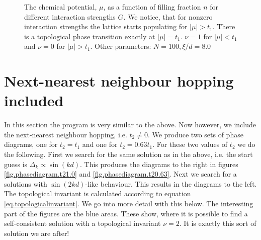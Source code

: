 \begin{figure}
\begin{center}

\caption{The chemical potential, $\mu$, as a function of filling fraction $n$ for different interaction strengths $G$. We notice, that for nonzero interaction strengths the lattice starts populating for $|\mu| > t_1$. There is a topological phase transition exactly at $|\mu| = t_1$. $\nu = 1$ for $|\mu|< t_1$ and $\nu = 0$ for $|\mu| > t_1$. Other parameters: $N = 100, \xi / d = 8.0$}
\label{fig.mun.t20.Gdepend}
\end{center}
\end{figure}

\section{Next-nearest neighbour hopping included}
\label{sec.NNNincluded} 
In this section the program is very similar to the above. Now however, we include the next-nearest neighbour hopping, i.e. $t_2 \neq 0$. We produce two sets of phase diagrams, one for $t_2 = t_1$ and one for $t_2 = 0.63t_1$. For these two values of $t_2$ we do the following. First we search for the same solution as in the above, i.e. the start guess is $\Delta_k \propto \sin(kd)$. This produces the diagrams to the right in figures \ref{fig.phasediagram.t21.0} and \ref{fig.phasediagram.t20.63}. Next we search for a solutions with $\sin(2kd)$-like behaviour. This results in the diagrams to the left. The topological invariant is calculated according to equation \eqref{eq.topologicalinvariant}. We go into more detail with this below. The interesting part of the figures are the blue areas. These show, where it is possible to find a self-consistent solution with a topological invariant $\nu = 2$. It is exactly this sort of solution we are after!  

